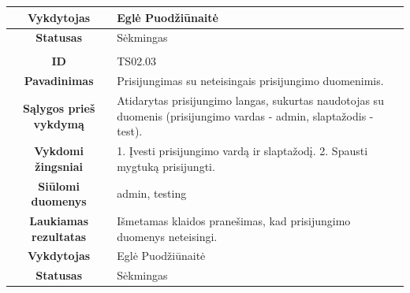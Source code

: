 \documentclass{VUMIFPSkursinis}
\begin{document}
	\begin{table}[H]
		\begin{tabular}{|p{6cm}|p{11cm}|}
			\hline
			\multicolumn{1}{|c|}{{\bfseries Vykdytojas}}&
			{Eglė Puodžiūnaitė}\\
			\hline
			\multicolumn{1}{|c|}{{\bfseries Statusas}}&
			{Sėkmingas}\\
			\hline
			\rowcolor{lightgray}
			\multicolumn{2}{|c|}{}\\
			\hline
			\multicolumn{1}{|c|}{{\bfseries ID}}&
			{TS02.03}\\
			\hline
			\multicolumn{1}{|c|}{{\bfseries Pavadinimas}}&
			{Prisijungimas su neteisingais prisijungimo duomenimis.}\\
			\hline
			\multicolumn{1}{|c|}{{\bfseries Sąlygos prieš vykdymą}}&
			{Atidarytas prisijungimo langas, sukurtas naudotojas su duomenis (prisijungimo vardas - admin, slaptažodis - test).}\\
			\hline
			\multicolumn{1}{|c|}{{\bfseries Vykdomi žingsniai}}&
			{1. Įvesti prisijungimo vardą ir slaptažodį.
			 2. Spausti mygtuką prisijungti.}\\
			\hline
			\multicolumn{1}{|c|}{{\bfseries Siūlomi duomenys}}&
			{admin, testing}\\
			\hline
			\multicolumn{1}{|c|}{{\bfseries Laukiamas rezultatas}}&
			{Išmetamas klaidos pranešimas, kad prisijungimo duomenys neteisingi.}\\
			\hline
			\multicolumn{1}{|c|}{{\bfseries Vykdytojas}}&
			{Eglė Puodžiūnaitė}\\
			\hline
			\multicolumn{1}{|c|}{{\bfseries Statusas}}&
			{Sėkmingas}\\
			\hline
		\end{tabular}
	\end{table}	
\end{document}
